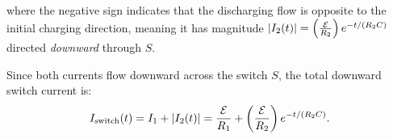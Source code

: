 \begin{example}
\begin{enumerate}
\begin{itemize}
        where the negative sign indicates that the discharging flow is opposite to the initial charging direction, meaning it has magnitude $\abs{I_2(t)} = \left(\frac{\mathcal{E}}{R_2}\right) e^{-t/(R_2 C)}$ directed \emph{downward} through $S$.
    \end{itemize}
    Since both currents flow downward across the switch $S$, the total downward switch current is:
    \begin{equation}
        I_{\text{switch}}(t) = I_1 + \abs{I_2(t)} = \frac{\mathcal{E}}{R_1} + \left( \frac{\mathcal{E}}{R_2} \right) e^{-t / (R_2 C)}.
    \end{equation}
\end{enumerate}
\end{example}